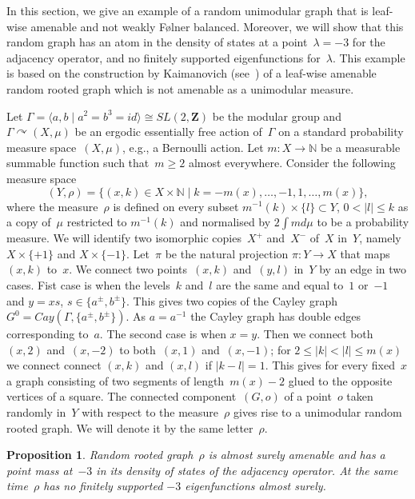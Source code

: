 \documentclass[english]{article}
\newtheorem{proposition}[lemma]{Proposition}
\theoremstyle{definition}
\newcommand*{\field}[1]{\mathbf{#1}} %
\newcommand*\Z{\field{Z}} %
\begin{document}
In this section, we give an example of a random unimodular graph that is leaf-wise amenable and not weakly {F\o lner} balanced. Moreover, we will show that this random graph has an atom in the density of states at a point~$\lambda = -3$ for the adjacency operator, and no finitely supported eigenfunctions for~$\lambda$. This example is based on the construction by Kaimanovich (see~\cite{Ka98}) of a leaf-wise amenable random rooted graph which is not amenable as a unimodular measure.

Let $\Gamma = \langle a,b \mid a^2 = b^3 = id\rangle \cong SL(2,\Z)$ be the modular group and $\Gamma \curvearrowright (X,\mu)$ be an ergodic essentially free action of~$\Gamma$ on a standard probability measure space~$(X,\mu)$, e.g., a Bernoulli action. Let $m\colon X \to \mathbb{N}$ be a measurable summable function such that~$m \ge 2$ almost everywhere. Consider the following measure space %
$$
(Y, \rho) = \{(x, k) \in X \times \mathbb{N} \mid k= -m(x),\ldots,-1,1, \ldots, m(x)\},
$$
where the measure~$\rho$ is defined on every subset $m^{-1}(k) \times\{l\} \subset Y$, $0<|l| \le k$  as a copy of~$\mu$ restricted to $m^{-1}(k)$ and normalised by $2\int md\mu$ to be a probability measure. We will identify two isomorphic copies~$X^+$ and~$X^-$ of~$X$ in~$Y$, namely $X \times \{+1\}$ and $X \times \{-1\}$. Let~$\pi$ be the natural projection $\pi \colon Y \to X$ that maps $(x,k)$ to~$x$. We connect two points~$(x,k)$ and~$(y, l)$ in~$Y$ by an edge in two cases. Fist case is when the levels~$k$ and~$l$ are the same and equal to~$1$ or~$-1$ and $y = xs$, $s \in \{a^{\pm}, b^{\pm} \}$. This gives two copies of the Cayley graph $G^0 =Cay(\Gamma, \{a^\pm, b^\pm\})$. As $a = a^{-1}$ the Cayley graph has double edges corresponding to~$a$. The second case is when $x = y$. Then we connect both~$(x,2)$ and~$(x,-2)$ to both~$(x,1)$ and~$(x, -1)$; for $2\le |k| < |l| \le m(x)$ we connect connect $(x, k)$ and $(x, l)$ if $|k-l| = 1$. This gives for every fixed~$x$ a graph consisting of two segments of length~$m(x) - 2$ glued to the opposite vertices of a square. The connected component~$(G,o)$ of a point~$o$ taken randomly in~$Y$ with respect to the measure~$\rho$ gives rise to a unimodular random rooted graph. We will denote it by the same letter~$\rho$. 

\begin{proposition}
    Random rooted graph~$\rho$ is almost surely amenable and has a point mass at~$-3$ in its density of states of the adjacency operator. At the same time~$\rho$ has no finitely supported $-3$ eigenfunctions almost surely. 
\end{proposition}
\end{document}
